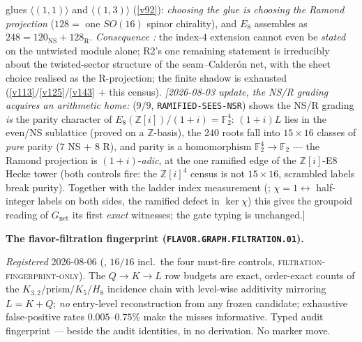 \documentclass[11pt,a4paper]{article}
\newcommand{\Z}{\mathbb Z}
\begin{document}
glues $\langle(1,1)\rangle$ and $\langle(1,3)\rangle$ (\vref{v92}): \emph{choosing the glue is choosing
the Ramond projection} ($128=$ one $SO(16)$ spinor chirality), and $E_8$ assembles as
$248=120_{\mathrm{NS}}+128_{\mathrm R}$. \emph{Consequence \mC:} the index-$4$ extension cannot even be
\emph{stated} on the untwisted module alone; R2's one remaining statement is irreducibly about the
twisted-sector structure of the seam--Calder\'on net, with the sheet choice realised as the R-projection;
the finite shadow is exhausted (\vref{v113}/\vref{v125}/\vref{v143} $+$ this census).
\emph{[2026-08-03 update, the NS/R grading acquires an arithmetic
home:}  ($9/9$,
\texttt{RAMIFIED-SEES-NSR}) shows the NS/R grading \emph{is} the
parity character of $E_8(\Z[i])/(1{+}i)=\mathbb F_2^4$: $(1{+}i)L$
lies in the even/NS sublattice (proved on a $\Z$-basis), the $240$
roots fall into $15\times16$ classes of \emph{pure} parity ($7$ NS
$+$ $8$ R), and parity is a homomorphism $\mathbb
F_2^4\to\mathbb F_2$ --- the Ramond projection is
$(1{+}i)$-\emph{adic}, at the one ramified edge of the
$\Z[i]$-E8 Hecke tower (both controls fire: the $\Z[i]^4$ census is
not $15\times16$, scrambled labels break purity).  Together with
the ladder index measurement (;
$\chi=1\leftrightarrow$ half-integer labels on both sides, the
ramified defect in $\ker\chi$) this gives the groupoid reading of
$G_{\mathrm{net}}$ its first \emph{exact} witnesses; the gate
typing is unchanged.]

\par\smallskip\noindent\textbf{The flavor-filtration fingerprint
(\texttt{FLAVOR.GRAPH.FILTRATION.01}).}
{\sloppy
\emph{Registered} 2026-08-06
(, $16/16$ incl.\ the
four must-fire controls, \textsc{filtration-fingerprint-only}).
The $Q\to K\to L$ row budgets are exact, order-exact counts of
the $K_{3,2}$/prism/$K_5$/$H_8$ incidence chain with level-wise
additivity mirroring $L=K+Q$; \emph{no} entry-level
reconstruction from any frozen candidate; exhaustive
false-positive rates $0.005$--$0.75\%$ make the misses
informative.  Typed audit fingerprint --- beside the audit
identities, in no derivation.  No marker move.\par}
\end{document}
